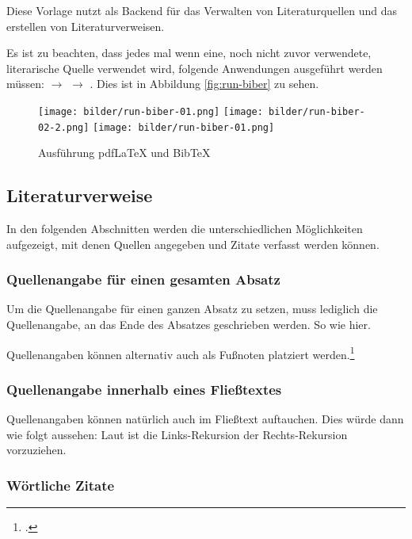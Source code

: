 Diese Vorlage nutzt  als Backend für das Verwalten von Literaturquellen und das erstellen von Literaturverweisen.

Es ist zu beachten, dass jedes mal wenn eine, noch nicht zuvor verwendete, literarische Quelle verwendet wird, folgende Anwendungen ausgeführt werden müssen:  $\rightarrow$  $\rightarrow$ . Dies ist in Abbildung \vref{fig:run-biber} zu sehen.

\begin{figure}
	\centering
	\texttt{[image: bilder/run-biber-01.png]}
	\texttt{[image: bilder/run-biber-02-2.png]}
	\texttt{[image: bilder/run-biber-01.png]}
	\caption{Ausführung pdfLaTeX und BibTeX}
	\label{fig:run-biber}
\end{figure}


\subsection{Literaturverweise}

In den folgenden Abschnitten werden die unterschiedlichen Möglichkeiten aufgezeigt, mit denen Quellen angegeben und Zitate verfasst werden können.


\subsubsection{Quellenangabe für einen gesamten Absatz}

Um die Quellenangabe für einen ganzen Absatz zu setzen, muss lediglich die Quellenangabe, an das Ende des Absatzes geschrieben werden. So wie hier.\\
\parencite[3-5]{angenendt}

Quellenangaben können alternativ auch als Fußnoten platziert werden.\footcite[7-14]{angenendt}


\subsubsection{Quellenangabe innerhalb eines Fließtextes}

Quellenangaben können natürlich auch im Fließtext auftauchen. Dies würde dann wie folgt aussehen: Laut \textcite[51]{angenendt} ist die Links-Rekursion der Rechts-Rekursion vorzuziehen.


\subsubsection{Wörtliche Zitate}

